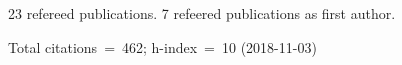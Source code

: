 23 refereed publications. 7 refeered publications as first author.

Total citations~=~462; h-index~=~10 (2018-11-03)